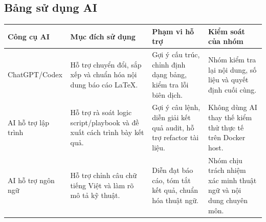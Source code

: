 \subsection{Bảng sử dụng AI}\label{bang-su-dung-ai}

{\def\LTcaptype{none}
\begin{center}
\label{tab:bang-su-dung-ai}
\end{center}
\begin{longtable}[]{@{}|
  >{\raggedright\arraybackslash}p{}|
  >{\raggedright\arraybackslash}p{}|
  >{\raggedright\arraybackslash}p{}|
  >{\raggedright\arraybackslash}p{}|@{}}
\hline
\begin{minipage}[b]{\linewidth}\raggedright
\textbf{Công cụ AI}
\end{minipage} & \begin{minipage}[b]{\linewidth}\raggedright
\textbf{Mục đích sử dụng}
\end{minipage} & \begin{minipage}[b]{\linewidth}\raggedright
\textbf{Phạm vi hỗ trợ}
\end{minipage} & \begin{minipage}[b]{\linewidth}\raggedright
\textbf{Kiểm soát của nhóm}
\end{minipage} \\
\hline
\endhead
ChatGPT/Codex & Hỗ trợ chuyển đổi, sắp xếp và chuẩn hóa nội dung báo cáo LaTeX. & Gợi ý cấu trúc, chỉnh định dạng bảng, kiểm tra lỗi biên dịch. & Nhóm kiểm tra lại nội dung, số liệu và quyết định cuối cùng. \\
\hline
AI hỗ trợ lập trình & Hỗ trợ rà soát logic script/playbook và đề xuất cách trình bày kết quả. & Gợi ý câu lệnh, diễn giải kết quả audit, hỗ trợ refactor tài liệu. & Không dùng AI thay thế kiểm thử thực tế trên Docker host. \\
\hline
AI hỗ trợ ngôn ngữ & Hỗ trợ chỉnh câu chữ tiếng Việt và làm rõ mô tả kỹ thuật. & Diễn đạt báo cáo, tóm tắt kết quả, chuẩn hóa thuật ngữ. & Nhóm chịu trách nhiệm xác minh thuật ngữ và nội dung chuyên môn. \\
\hline
\end{longtable}
}
